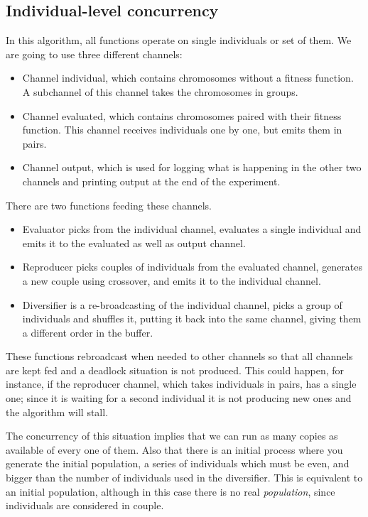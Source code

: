 \documentclass[sigconf]{acmart}
\begin{document}
\subsection{Individual-level concurrency}
\label{ss:indi}

In this algorithm, all functions operate on single individuals or set
of them. We are going to use three different channels:\begin{itemize}
\item Channel {\sf individual}, which contains chromosomes without a fitness
  function. A subchannel of this channel takes the chromosomes in groups.
\item Channel {\sf evaluated}, which contains chromosomes paired with
  their fitness function. This channel receives individuals one by
  one, but emits them in pairs.
\item Channel {\sf output}, which is used for logging what is
  happening in the other two channels and printing output at the end
  of the experiment.
\end{itemize}

There are two functions feeding these channels. \begin{itemize}
  
\item {\sf Evaluator} picks from the {\sf individual} channel,
  evaluates a single individual and emits it to the {\sf evaluated} as
  well as {\sf output} channel. 
\item {\sf Reproducer} picks couples of individuals from the {\sf
    evaluated} channel, generates a new couple using crossover, and
  emits it to the {\sf individual} channel. 
\item {\sf Diversifier} is a re-broadcasting of the {\sf individual
    channel}, picks a group of individuals and shuffles it, putting it
  back into the same channel, giving them a different order in the
  buffer.
\end{itemize}

These functions rebroadcast when needed to other channels so that all
channels are kept fed and a deadlock situation is not produced. This
could happen, for instance, if the {\sf reproducer channel}, which
takes individuals in pairs, has a single one; since it is waiting for
a second individual it is not producing new ones and the algorithm
will stall. 

The concurrency of this situation implies that we can run as many
copies as available of every one of them. Also that there is an
initial process where you generate the initial population, a series of
individuals which must be even, and bigger than the number of
individuals used in the diversifier. This is equivalent to an initial
population, although in this case there is no real {\em population},
since individuals are considered in couple. 
\end{document}
